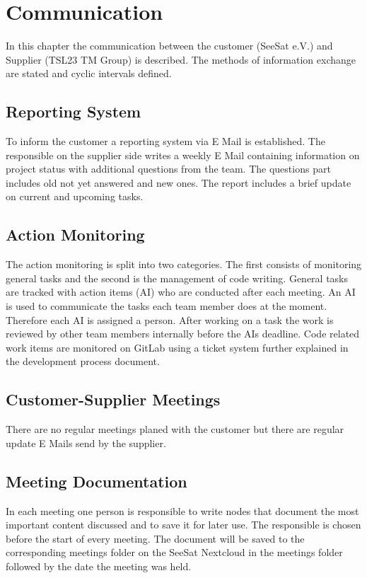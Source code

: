 \chapter{Communication}
In this chapter the communication between the customer (SeeSat e.V.) and Supplier (TSL23 TM Group) is described. The methods of information exchange are stated and cyclic intervals defined.

\section{Reporting System}
To inform the customer a reporting system via E Mail is established. The responsible on the supplier side writes a weekly E Mail containing information on project status with additional questions from the team. The questions part includes old not yet answered and new ones. The report includes a brief update on current and upcoming tasks.

\section{Action Monitoring}
The action monitoring is split into two categories. The first consists of monitoring general tasks and the second is the management of code writing. General tasks are tracked with action items (AI) who are conducted after each meeting. An AI is used to communicate the tasks each team member does at the moment. Therefore each AI is assigned a person. After working on a task the work is reviewed by other team members internally before the AIs deadline. Code related work items are monitored on GitLab using a ticket system further explained in the development process document.

\section{Customer-Supplier Meetings}
There are no regular meetings planed with the customer but there are regular update E Mails send by the supplier.

\section{Meeting Documentation}
In each meeting one person is responsible to write nodes that document the most important content discussed and to save it for later use. The responsible is chosen before the start of every meeting. The document will be saved to the corresponding meetings folder on the SeeSat Nextcloud in the meetings folder followed by the date the meeting was held.

